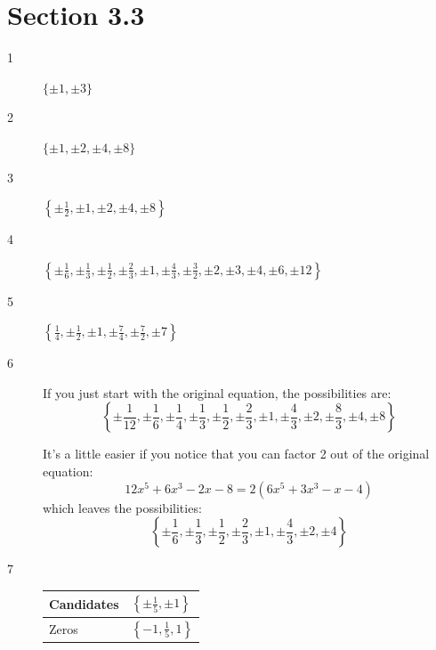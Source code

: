 \documentclass{exam}
\begin{document}
  \ifprintanswers
    \pagebreak

    \section{Section 3.3}

    \begin{description}

      \item[1] $\{\pm 1, \pm 3 \}$

      \item[2] $\{\pm 1, \pm 2, \pm 4, \pm 8 \}$

      \item[3] $\left\{ \pm \frac{1}{2}, \pm 1, \pm 2, \pm 4, \pm 8 \right\}$

      \item[4] 
        $\left\{ \pm \frac{1}{6}, \pm \frac{1}{3}, \pm \frac{1}{2}, \pm \frac{2}{3}, \pm 1, \pm \frac{4}{3}, 
          \pm \frac{3}{2}, \pm 2, \pm 3, \pm 4, \pm 6, \pm 12 \right\}$

      \item[5] $\left\{ \frac{1}{4}, \pm \frac{1}{2}, \pm 1, \pm \frac{7}{4}, \pm \frac{7}{2}, \pm 7 \right\}$

      \item[6] 
        If you just start with the original equation, the possibilities are:
        \[
          \left\{ \pm \frac{1}{12}, \pm \frac{1}{6}, \pm \frac{1}{4}, \pm \frac{1}{3}, \pm \frac{1}{2}, 
          \pm \frac{2}{3}, \pm 1, \pm \frac{4}{3}, \pm 2, \pm \frac{8}{3}, \pm 4, \pm 8 \right\}
        \]

        It's a little easier if you notice that you can factor 2 out of the original equation:
        \[
          12x^5 + 6x^3 - 2x - 8 = 2(6x^5 + 3x^3 - x - 4)
        \]
        which leaves the possibilities:
        \[
          \left\{ \pm \frac{1}{6}, \pm \frac{1}{3}, \pm \frac{1}{2}, 
          \pm \frac{2}{3}, \pm 1, \pm \frac{4}{3}, \pm 2, \pm 4 \right\}
        \]

      \item[7]
        \begin{tabular}{ll}
          \toprule
          Candidates & $\left\{ \pm \frac{1}{5}, \pm 1 \right\}$ \\
          \midrule
          Zeros      & $\left\{ -1, \frac{1}{5}, 1 \right\}$ \\
          \bottomrule
        \end{tabular}

        \vspace{.5 cm}


\end{description}
\end{document}
